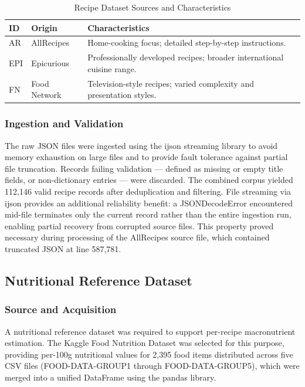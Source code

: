 \documentclass[conference]{IEEEtran}
\begin{document}
\begin{table}[H]
\caption{Recipe Dataset Sources and Characteristics}
\label{tab:recipe_sources}
\centering
\footnotesize
\begin{tabular}{p{0.8cm} p{1.5cm} p{4.2cm}}
\toprule
\textbf{ID} & \textbf{Origin} & \textbf{Characteristics} \\
\midrule
AR  & AllRecipes &
Home-cooking focus; detailed step-by-step instructions. \\

EPI & Epicurious &
Professionally developed recipes; broader international cuisine range. \\

FN  & Food Network &
Television-style recipes; varied complexity and presentation styles. \\
\bottomrule
\end{tabular}
\end{table}

\subsubsection{Ingestion and Validation}
The raw JSON files were ingested using the ijson streaming library to avoid memory exhaustion on large files and to provide fault tolerance against partial file truncation. Records failing validation — defined as missing or empty title fields, or non-dictionary entries — were discarded. The combined corpus yielded 112,146 valid recipe records after deduplication and filtering. File streaming via ijson provides an additional reliability benefit: a JSONDecodeError encountered mid-file terminates only the current record rather than the entire ingestion run, enabling partial recovery from corrupted source files. This property proved necessary during processing of the AllRecipes source file, which contained truncated JSON at line 587,781.

\subsection{Nutritional Reference Dataset}
\subsubsection{Source and Acquisition}
 A nutritional reference dataset was required to support per-recipe macronutrient estimation. The Kaggle Food Nutrition Dataset \cite{dey2023foodnutrition} was selected for this purpose, providing per-100g nutritional values for 2,395 food items distributed across five CSV files (FOOD-DATA-GROUP1 through FOOD-DATA-GROUP5), which were merged into a unified DataFrame using the pandas library.
\end{document}
